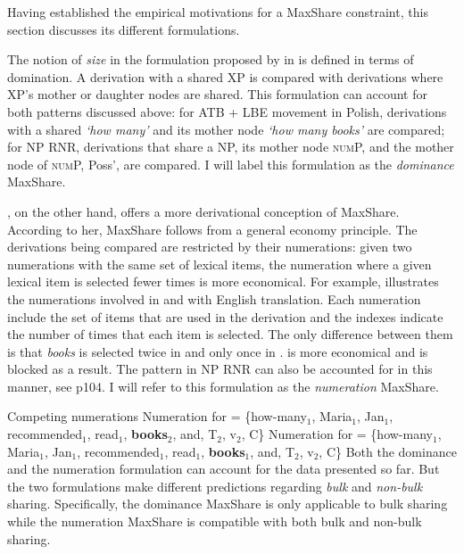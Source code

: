 \documentclass[output=paper]{langscibook}
\begin{document}
Having established the empirical motivations for a MaxShare constraint, this section discusses its different formulations. 

The notion of \textit{size} in the formulation proposed by \citet{Shen:2018a} in  is defined in terms of domination. A derivation with a shared XP is compared with derivations where XP's mother or daughter nodes are shared. This formulation can account for both patterns discussed above: for ATB + LBE movement in Polish, derivations with a shared \textit{`how many'} and its mother node \textit{`how many books'} are compared; for NP RNR, derivations that share a NP, its mother node \textsc{num}P, and the mother node of \textsc{num}P, Poss', are compared. I will label this formulation as the \textit{dominance} MaxShare.

\citet{Citko:2006}, on the other hand, offers a more derivational conception of MaxShare. According to her, MaxShare follows from a general economy principle. The derivations being compared are restricted by their numerations: given two numerations with the same set of lexical items, the numeration where a given lexical item is selected fewer times is more economical. For example,  illustrates the numerations involved in  and  with English translation. Each numeration include the set of items that are used in the derivation and the indexes indicate the number of times that each item is selected. The only difference between them is that \textit{books} is selected twice in  and only once in .  is more economical and  is blocked as a result. 
The pattern in NP RNR can also be accounted for in this manner, see \citet{Shen:2018a} p104. I will refer to this formulation as the \textit{numeration} MaxShare.

\ea 
	\label{shenshenex12}
	Competing numerations
	\ea 
		\label{shenshenex12:a}
		Numeration for  = \{how-many$_1$, Maria$_1$, Jan$_1$, recommended$_1$, read$_1$, \textbf{books$_2$}, and, T$_2$, v$_2$, C\}
	\ex 
		\label{shenshenex12:b}
		Numeration for  = \{how-many$_1$, Maria$_1$, Jan$_1$, recommended$_1$, read$_1$, \textbf{books$_1$}, and, T$_2$, v$_2$, C\} 
	\z 
\z 
Both the dominance and the numeration formulation can account for the data presented so far. 
But the two formulations make different predictions regarding \textit{bulk} and \textit{non-bulk} sharing. 
Specifically, the dominance MaxShare is only applicable to bulk sharing while the numeration MaxShare is compatible with both bulk and non-bulk sharing. 
\end{document}
